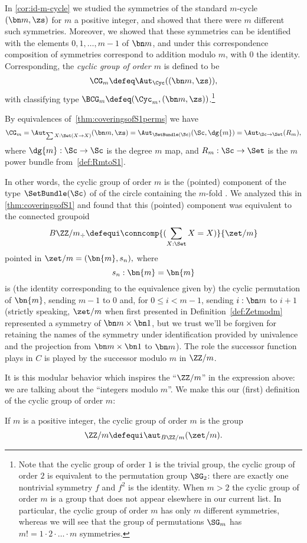 \begin{example}\label{ex:cyclicgroups}
  In \cref{cor:id-m-cycle} we studied the symmetries of the standard $m$-cycle $(\bn m,\zs)$
  for $m$ a positive integer, and showed that there were $m$ different
  such symmetries.
  Moreover, we showed that these symmetries can be identified with the elements
  $0,1,\dots,m-1$ of $\bn m$,
  and under this correspondence composition of symmetries correspond to
  addition modulo $m$, with $0$ the identity.
  Corresponding, the \emph{cyclic group of order $m$} is defined to be
  \[
    \CG_m \defeq \Aut_\Cyc((\bn m,\zs)),
  \]
  with classifying type $\BCG_m \defeq (\Cyc_m, (\bn m,\zs))$.\footnote{%
    Note that the cyclic group of order $1$ is the trivial group,
    the cyclic group of order $2$ is equivalent to the permutation group $\SG_2$:
    there are exactly one nontrivial symmetry $f$ and $f^2$ is the identity.
    When $m>2$ the cyclic group of order $m$ is a group that does not appear elsewhere in our current list.
    In particular, the cyclic group of order $m$ has only $m$ different symmetries, whereas we will see that the group of permutations $\SG_m$ has $m!=1\cdot 2\cdot\dots\cdot m$ symmetries.}

  By equivalences of~\cref{thm:coveringsofS1perms} we have
  \[
    \CG_m = \Aut_{\sum{X:\Set}(X\to X)}(\bn m,\zs)
    = \Aut_{\SetBundle(\Sc)}(\Sc,\dg{m})
    = \Aut_{\Sc\to\Set}(R_m),
  \]
  where $\dg{m} : \Sc \to \Sc$ is the degree $m$ map,
  and $R_m : \Sc \to \Set$ is the $m$\th power bundle from~\cref{def:RmtoS1}.

In other words, the cyclic group of order $m$ is the (pointed) component of the type $\SetBundle(\Sc)$ of \coverings of the circle containing the $m$-fold \covering.
We analyzed this in \cref{thm:coveringsofS1} and found that this (pointed) component was equivalent to the connected groupoid
$$B\ZZ/m_\div\defequi\conncomp{(\sum_{X:\Set}X=X)}{\zet/m}$$
pointed in $\zet/m = (\bn{m},s_n),$
where
$$s_n :\bn{m}=\bn{m}$$ is (the identity corresponding to the equivalence given by)
the cyclic permutation of $\bn{m}$, sending $m-1$ to $0$ and,
for $0\leq i<m-1$, sending $i:\bn m$ to $i+1$ (strictly speaking, $\zet/m$ when first presented in Definition~\ref{def:Zetmodm} represented a symmetry of $\bn m\times\bn 1$, but we trust we'll be forgiven for retaining the names of the symmetry under identification provided by univalence and the projection from $\bn m\times \bn1$ to $\bn m$). The role
the successor function plays in $C$ is played by the successor modulo $m$ in $\ZZ/m$.

It is this modular behavior which inspires the ``$\ZZ/m$'' in the expression above: we are talking about the ``integers modulo $m$''.
We make this our (first) definition of the cyclic group of order $m$:
\end{example}
\begin{definition}\label{def:Z/mgroup}
  If $m$ is a positive integer, the cyclic group of order $m$ is the group
  $$\ZZ/m\defequi\aut_{B\ZZ/m}(\zet/m).$$
\end{definition}


